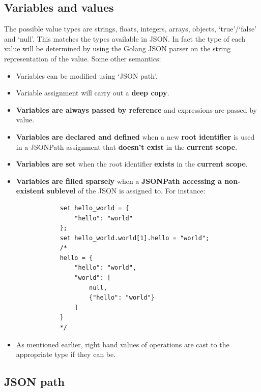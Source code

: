 \documentclass[]{interim}
\theoremstyle{definition}
\begin{document}
\subsection{Variables and values}

The possible value types are strings, floats, integers, arrays, objects, `true'/`false' and `null'. This matches the types available in JSON. In fact the type of each value will be determined by using the Golang JSON parser on the string representation of the value. Some other semantics:

\begin{center}
    \begin{itemize} 
        \item Variables can be modified using `JSON path'.
        \item Variable assignment will carry out a \textbf{deep copy}.
        \item \textbf{Variables are always passed by reference} and expressions are passed by value.
        \item \textbf{Variables are declared and defined} when a new \textbf{root identifier} is used in a JSONPath assignment that \textbf{doesn't exist} in the \textbf{current scope}.
        \item \textbf{Variables are set} when the root identifier \textbf{exists} in the \textbf{current scope}.
        \item \textbf{Variables are filled sparsely} when a \textbf{JSONPath accessing a non-existent sublevel} of the JSON is assigned to. For instance:
        \begin{verbatim}
            set hello_world = {
                "hello": "world"
            };
            set hello_world.world[1].hello = "world";
            /*
            hello = {
                "hello": "world",
                "world": [
                    null,
                    {"hello": "world"}
                ]
            }
            */
        \end{verbatim}
        \item As mentioned earlier, right hand values of operations are cast to the appropriate type if they can be. 
    \end{itemize}
\end{center}

\subsection{JSON path}
\end{document}

